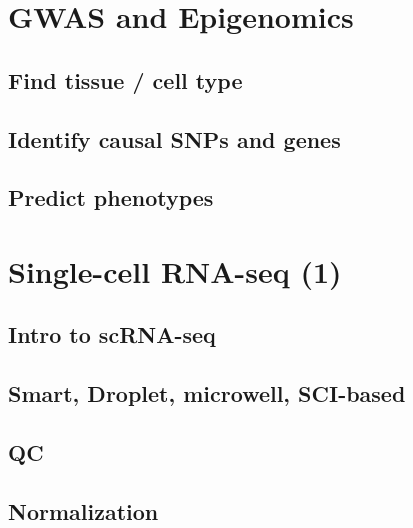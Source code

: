 \documentclass[]{book}
\begin{document}
\hypertarget{gwas2}{%
\chapter{GWAS and Epigenomics}\label{gwas2}}

\hypertarget{find-tissue-cell-type}{%
\section{Find tissue / cell type}\label{find-tissue-cell-type}}

\hypertarget{identify-causal-snps-and-genes}{%
\section{Identify causal SNPs and genes}\label{identify-causal-snps-and-genes}}

\hypertarget{predict-phenotypes}{%
\section{Predict phenotypes}\label{predict-phenotypes}}

\hypertarget{scrna1}{%
\chapter{Single-cell RNA-seq (1)}\label{scrna1}}

\hypertarget{intro-to-scrna-seq}{%
\section{Intro to scRNA-seq}\label{intro-to-scrna-seq}}

\hypertarget{smart-droplet-microwell-sci-based}{%
\section{Smart, Droplet, microwell, SCI-based}\label{smart-droplet-microwell-sci-based}}

\hypertarget{qc}{%
\section{QC}\label{qc}}

\hypertarget{normalization}{%
\section{Normalization}\label{normalization}}
\end{document}
